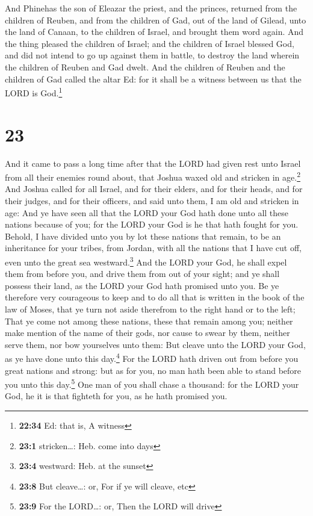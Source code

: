  And Phinehas the son of Eleazar the priest, and the
princes, returned from the children of Reuben, and from the children of
Gad, out of the land of Gilead, unto the land of Canaan, to the children
of Israel, and brought them word again.  And the thing
pleased the children of Israel; and the children of Israel blessed God,
and did not intend to go up against them in battle, to destroy the land
wherein the children of Reuben and Gad dwelt.  And the
children of Reuben and the children of Gad called the altar Ed: for it
shall be a witness between us that the LORD is God.\footnote{\textbf{22:34}
  Ed: that is, A witness}

\hypertarget{section-22}{%
\section{23}\label{section-22}}

 And it came to pass a long time after that the LORD had
given rest unto Israel from all their enemies round about, that Joshua
waxed old and stricken in age.\footnote{\textbf{23:1} stricken\ldots:
  Heb. come into days}  And Joshua called for all Israel,
and for their elders, and for their heads, and for their judges, and for
their officers, and said unto them, I am old and stricken in age:
 And ye have seen all that the LORD your God hath done
unto all these nations because of you; for the LORD your God is he that
hath fought for you.  Behold, I have divided unto you by
lot these nations that remain, to be an inheritance for your tribes,
from Jordan, with all the nations that I have cut off, even unto the
great sea westward.\footnote{\textbf{23:4} westward: Heb. at the sunset}
 And the LORD your God, he shall expel them from before
you, and drive them from out of your sight; and ye shall possess their
land, as the LORD your God hath promised unto you.  Be ye
therefore very courageous to keep and to do all that is written in the
book of the law of Moses, that ye turn not aside therefrom to the right
hand or to the left;  That ye come not among these
nations, these that remain among you; neither make mention of the name
of their gods, nor cause to swear by them, neither serve them, nor bow
yourselves unto them:  But cleave unto the LORD your God,
as ye have done unto this day.\footnote{\textbf{23:8} But cleave\ldots:
  or, For if ye will cleave, etc}  For the LORD hath
driven out from before you great nations and strong: but as for you, no
man hath been able to stand before you unto this day.\footnote{\textbf{23:9}
  For the LORD\ldots: or, Then the LORD will drive}  One
man of you shall chase a thousand: for the LORD your God, he it is that
fighteth for you, as he hath promised you.

